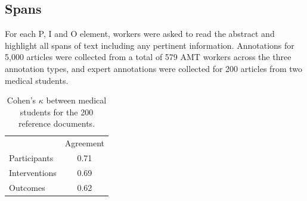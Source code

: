 \documentclass[11pt,a4paper]{article}
\begin{document}

\subsection{Spans}
\label{section:corpus-spans}
For each P, I and O element, workers were asked to read the abstract and highlight all spans of text including any pertinent information. Annotations for 5,000 articles were collected from a total of 579 AMT workers across the three annotation types, and expert annotations were collected for 200 articles from two medical students. %

\begin{table}[h]%
    \centering
    \small
    \begin{tabular}{ l c } 
         & Agreement \\
         \cline{2-2}
         Participants & 0.71 \\
         Interventions & 0.69 \\
         Outcomes & 0.62 \\
    \end{tabular}
    \caption{Cohen's $\kappa$ between medical students for the 200 reference documents.}
     \label{tab:span_agreement}
\end{table}
\end{document}
